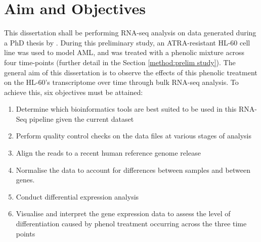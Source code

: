 \section{Aim and Objectives} 
This dissertation shall be performing RNA-seq analysis on data generated during a PhD thesis by \cite{Gatt2016}. During this preliminary study, an \ac{ATRA}-resistant HL-60 cell line was used to model \ac{AML}, and was treated with a phenolic mixture across four time-points (further detail in the Section \ref{method:prelim study}). The general aim of this dissertation is to observe the effects of this phenolic treatment on the HL-60’s transcriptome over time through bulk RNA-seq analysis. To achieve this, six objectives must be attained:

\begin{enumerate}
\item Determine which bioinformatics tools are best suited to be used in this RNA-Seq pipeline given the current dataset
\item Perform quality control checks on the data files at various stages of analysis
\item Align the reads to a recent human reference genome release
\item Normalise the data to account for differences between samples and between genes.
\item Conduct differential expression analysis
\item Visualise and interpret the gene expression data to assess the level of differentiation caused by phenol treatment occurring across the three time points
\end{enumerate}




